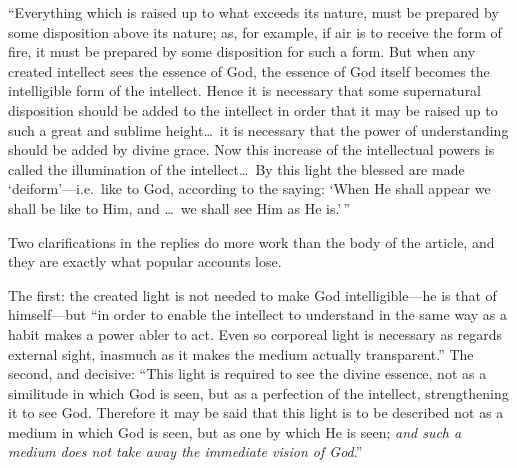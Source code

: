 \begin{studyframe}
``Everything which is raised up to what exceeds its nature, must be prepared by some disposition above its nature; as, for example, if air is to receive the form of fire, it must be prepared by some disposition for such a form. But when any created intellect sees the essence of God, the essence of God itself becomes the intelligible form of the intellect. Hence it is necessary that some supernatural disposition should be added to the intellect in order that it may be raised up to such a great and sublime height\ldots\ it is necessary that the power of understanding should be added by divine grace. Now this increase of the intellectual powers is called the illumination of the intellect\ldots\ By this light the blessed are made `deiform'---i.e.\ like to God, according to the saying: `When He shall appear we shall be like to Him, and \ldots\ we shall see Him as He is.'\,''
\end{studyframe}

Two clarifications in the replies do more work than the body of the article, and they are exactly what popular accounts lose.

The first: the created light is not needed to make God intelligible---he is that of himself---but ``in order to enable the intellect to understand in the same way as a habit makes a power abler to act. Even so corporeal light is necessary as regards external sight, inasmuch as it makes the medium actually transparent.'' The second, and decisive: ``This light is required to see the divine essence, not as a similitude in which God is seen, but as a perfection of the intellect, strengthening it to see God. Therefore it may be said that this light is to be described not as a medium in which God is seen, but as one by which He is seen; \emph{and such a medium does not take away the immediate vision of God}.''

